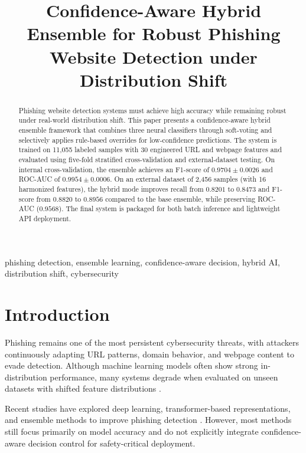 ﻿\documentclass[conference]{IEEEtran}
\title{Confidence-Aware Hybrid Ensemble for Robust Phishing Website Detection under Distribution Shift}
\author{}
\begin{document}
\maketitle

\begin{abstract}
Phishing website detection systems must achieve high accuracy while remaining robust under real-world distribution shift. This paper presents a confidence-aware hybrid ensemble framework that combines three neural classifiers through soft-voting and selectively applies rule-based overrides for low-confidence predictions. The system is trained on 11,055 labeled samples with 30 engineered URL and webpage features and evaluated using five-fold stratified cross-validation and external-dataset testing. On internal cross-validation, the ensemble achieves an F1-score of $0.9704 \pm 0.0026$ and ROC-AUC of $0.9954 \pm 0.0006$. On an external dataset of 2,456 samples (with 16 harmonized features), the hybrid mode improves recall from $0.8201$ to $0.8473$ and F1-score from $0.8820$ to $0.8956$ compared to the base ensemble, while preserving ROC-AUC ($0.9568$). The final system is packaged for both batch inference and lightweight API deployment.
\end{abstract}

\begin{IEEEkeywords}
phishing detection, ensemble learning, confidence-aware decision, hybrid AI, distribution shift, cybersecurity
\end{IEEEkeywords}

\section{Introduction}
Phishing remains one of the most persistent cybersecurity threats, with attackers continuously adapting URL patterns, domain behavior, and webpage content to evade detection. Although machine learning models often show strong in-distribution performance, many systems degrade when evaluated on unseen datasets with shifted feature distributions \cite{jisa2023highaccuracy,rashid2024uda,komosny2025languages,duarte2025parked}. 

Recent studies have explored deep learning, transformer-based representations, and ensemble methods to improve phishing detection \cite{haq2024cnn,aslam2024antiphishstack,he2024tinybert,su2023bert,remya2025bglphishnet,zhou2025enlem}. However, most methods still focus primarily on model accuracy and do not explicitly integrate confidence-aware decision control for safety-critical deployment.
\end{document}
